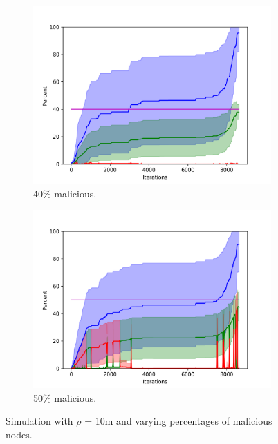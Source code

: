 \begin{figure}
\begin{subfigure}{0.45\textwidth}
\includegraphics[width=\linewidth]{images/plots/Network_rA/10_40.png}
\caption{40\% malicious.}
\end{subfigure}
\hspace*{0.1cm} %
\begin{subfigure}{0.45\textwidth}
\includegraphics[width=\linewidth]{images/plots/Network_rA/10_50.png}
\caption{50\% malicious.}
\end{subfigure}


\caption{Simulation with $\rho$ = 10m and varying percentages of malicious nodes.}\label{fig:tarjan}
\end{figure}

